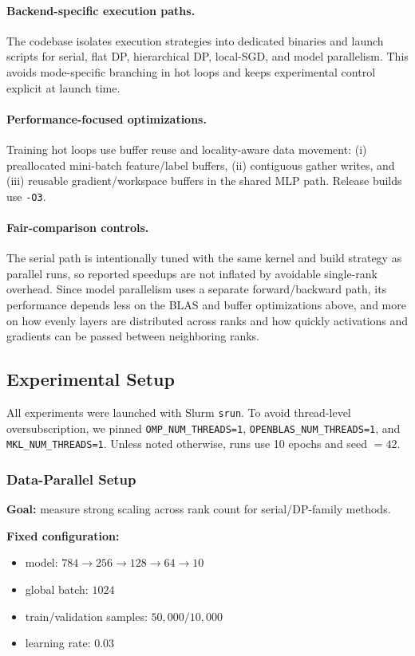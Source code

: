 \documentclass[11pt]{article}
\begin{document}
\paragraph{Backend-specific execution paths.}
The codebase isolates execution strategies into dedicated binaries and launch
scripts for serial, flat DP, hierarchical DP, local-SGD, and model parallelism.
This avoids mode-specific branching in hot loops and keeps experimental control
explicit at launch time.

\paragraph{Performance-focused optimizations.}
Training hot loops use buffer reuse and locality-aware data movement:
(i) preallocated mini-batch feature/label buffers, (ii) contiguous gather
writes, and (iii) reusable gradient/workspace buffers in the shared MLP path.
Release builds use \texttt{-O3}.

\paragraph{Fair-comparison controls.}
The serial path is intentionally tuned with the same kernel and build strategy
as parallel runs, so reported speedups are not inflated by avoidable single-rank
overhead. Since model parallelism uses a separate
forward/backward path, its performance depends less on the BLAS and
buffer optimizations above, and more on how evenly layers are distributed across ranks and how quickly activations and gradients can be passed between neighboring ranks.

\subsection{Experimental Setup}
\label{sec:setup}
All experiments were launched with Slurm \texttt{srun}. To avoid thread-level
oversubscription, we pinned \texttt{OMP\_NUM\_THREADS=1},
\texttt{OPENBLAS\_NUM\_THREADS=1}, and \texttt{MKL\_NUM\_THREADS=1}. Unless
noted otherwise, runs use 10 epochs and seed \(=42\).

\subsubsection{Data-Parallel Setup}
\textbf{Goal:} measure strong scaling across rank count for serial/DP-family
methods.

\textbf{Fixed configuration:}
\begin{itemize}[nosep]
  \item model: \(784 \rightarrow 256 \rightarrow 128 \rightarrow 64 \rightarrow 10\)
  \item global batch: \(1024\)
  \item train/validation samples: \(50{,}000 / 10{,}000\)
  \item learning rate: \(0.03\)
\end{itemize}
\end{document}
